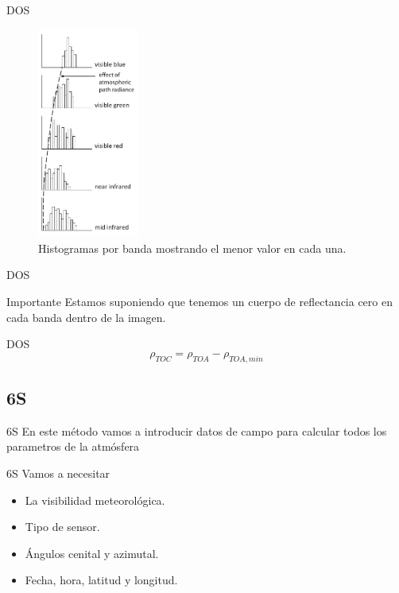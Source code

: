 \documentclass[handout]{beamer}
\begin{document}
\begin{frame}{DOS}
  \begin{figure}
  \centering
  \includegraphics[width=0.30\textwidth]{imagenes/dos.png}
  \caption{Histogramas por banda mostrando el menor valor en cada una.}
  \end{figure}
\end{frame}

\begin{frame}{DOS}
  \begin{alertblock}{Importante}
    Estamos suponiendo que tenemos un cuerpo de reflectancia cero en cada banda dentro de la imagen.
  \end{alertblock}
\end{frame}

\begin{frame}{DOS}
  \begin{equation}
    \rho_{TOC} = \rho_{TOA} - \rho_{TOA,min}
  \end{equation}
\end{frame}

\subsection{6S}
\begin{frame}{6S}
  En este método vamos a introducir datos de campo para calcular todos los parametros de la atmósfera
\end{frame}

\begin{frame}{6S}
  Vamos a necesitar
  \begin{itemize}
    \item La visibilidad meteorológica.
    \item Tipo de sensor.
    \item Ángulos cenital y azimutal.
    \item Fecha, hora, latitud y longitud.
  \end{itemize}
\end{frame}
\end{document}
